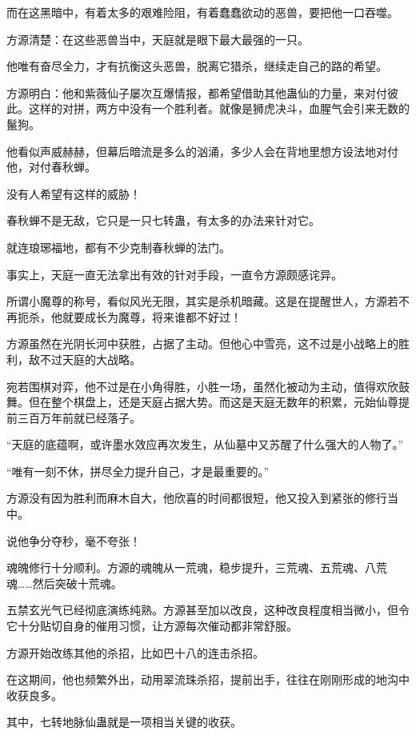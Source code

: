 \begin{this_body}
而在这黑暗中，有着太多的艰难险阻，有着蠢蠢欲动的恶兽，要把他一口吞噬。

方源清楚：在这些恶兽当中，天庭就是眼下最大最强的一只。

他唯有奋尽全力，才有抗衡这头恶兽，脱离它猎杀，继续走自己的路的希望。

方源明白：他和紫薇仙子屡次互爆情报，都希望借助其他蛊仙的力量，来对付彼此。这样的对拼，两方中没有一个胜利者。就像是狮虎决斗，血腥气会引来无数的鬣狗。

他看似声威赫赫，但幕后暗流是多么的汹涌，多少人会在背地里想方设法地对付他，对付春秋蝉。

没有人希望有这样的威胁！

春秋蝉不是无敌，它只是一只七转蛊，有太多的办法来针对它。

就连琅琊福地，都有不少克制春秋蝉的法门。

事实上，天庭一直无法拿出有效的针对手段，一直令方源颇感诧异。

所谓小魔尊的称号，看似风光无限，其实是杀机暗藏。这是在提醒世人，方源若不再扼杀，他就要成长为魔尊，将来谁都不好过！

方源虽然在光阴长河中获胜，占据了主动。但他心中雪亮，这不过是小战略上的胜利，敌不过天庭的大战略。

宛若围棋对弈，他不过是在小角得胜，小胜一场，虽然化被动为主动，值得欢欣鼓舞。但在整个棋盘上，还是天庭占据大势。而这是天庭无数年的积累，元始仙尊提前三百万年前就已经落子。

“天庭的底蕴啊，或许墨水效应再次发生，从仙墓中又苏醒了什么强大的人物了。”

“唯有一刻不休，拼尽全力提升自己，才是最重要的。”

方源没有因为胜利而麻木自大，他欣喜的时间都很短，他又投入到紧张的修行当中。

说他争分夺秒，毫不夸张！

魂魄修行十分顺利。方源的魂魄从一荒魂，稳步提升，三荒魂、五荒魂、八荒魂……然后突破十荒魂。

五禁玄光气已经彻底演练纯熟。方源甚至加以改良，这种改良程度相当微小，但令它十分贴切自身的催用习惯，让方源每次催动都非常舒服。

方源开始改练其他的杀招，比如巴十八的连击杀招。

在这期间，他也频繁外出，动用翠流珠杀招，提前出手，往往在刚刚形成的地沟中收获良多。

其中，七转地脉仙蛊就是一项相当关键的收获。

\end{this_body}

